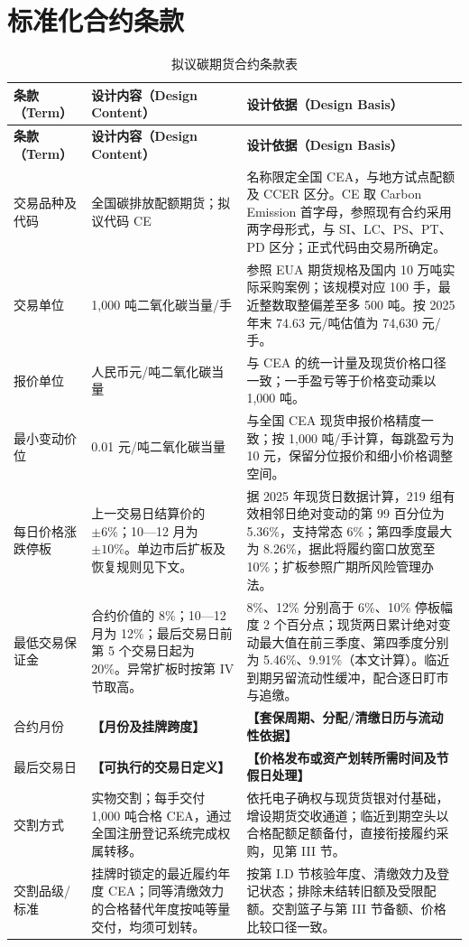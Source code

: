 \documentclass[UTF8,a4paper,11pt,oneside,fontset=fandol]{ctexart}
\newcommand{\fillin}[1]{\textcolor{promptgray}{\textbf{【#1】}}}
\begin{document}
\section{标准化合约条款}
\small
\begin{longtable}{@{}L{0.225\textwidth}L{0.265\textwidth}L{0.445\textwidth}@{}}
\caption{拟议碳期货合约条款表}\label{tab:contract}\\
\toprule
\textbf{条款（Term）} & \textbf{设计内容（Design Content）} & \textbf{设计依据（Design Basis）}\\
\midrule
\endfirsthead
\toprule
\textbf{条款（Term）} & \textbf{设计内容（Design Content）} & \textbf{设计依据（Design Basis）}\\
\midrule
\endhead
\bottomrule
\endfoot
交易品种及代码 & 全国碳排放配额期货；拟议代码 CE & 名称限定全国 CEA，与地方试点配额及 CCER 区分。CE 取 Carbon Emission 首字母，参照现有合约采用两字母形式\cite{gfexProductCodes2026}，与 SI、LC、PS、PT、PD 区分；正式代码由交易所确定。\\
交易单位 & 1,000 吨二氧化碳当量/手 & 参照 EUA 期货规格及国内 10 万吨实际采购案例\cite{iceEuaSpecs,sinopec2021bulk}；该规模对应 100 手，最近整数取整偏差至多 500 吨。按 2025 年末 74.63 元/吨\cite{mee2026}估值为 74,630 元/手。\\
报价单位 & 人民币元/吨二氧化碳当量 & 与 CEA 的统一计量\cite{state2024}及现货价格口径\cite{she2025daily}一致；一手盈亏等于价格变动乘以 1,000 吨。\\
最小变动价位 & 0.01 元/吨二氧化碳当量 & 与全国 CEA 现货申报价格精度一致\cite{mee2021trade}；按 1,000 吨/手计算，每跳盈亏为 10 元，保留分位报价和细小价格调整空间。\\
每日价格涨跌停板 & 上一交易日结算价的 $\pm6\%$；10—12 月为 $\pm10\%$。单边市后扩板及恢复规则见下文。 & 据 2025 年现货日数据\cite{she2025daily}计算，219 组有效相邻日绝对变动的第 99 百分位为 5.36\%，支持常态 6\%；第四季度最大为 8.26\%，据此将履约窗口放宽至 10\%；扩板参照广期所风险管理办法\cite{gfexRisk2022reprint}。\\
最低交易保证金 & 合约价值的 8\%；10—12 月为 12\%；最后交易日前第 5 个交易日起为 20\%。异常扩板时按第 IV 节取高。 & 8\%、12\% 分别高于 6\%、10\% 停板幅度 2 个百分点；现货两日累计绝对变动最大值在前三季度、第四季度分别为 5.46\%、9.91\%\cite{she2025daily}（本文计算）。临近到期另留流动性缓冲，配合逐日盯市与追缴。\\
合约月份 & \fillin{月份及挂牌跨度} & \fillin{套保周期、分配/清缴日历与流动性依据}\\
最后交易日 & \fillin{可执行的交易日定义} & \fillin{价格发布或资产划转所需时间及节假日处理}\\
交割方式 & 实物交割；每手交付 1,000 吨合格 CEA，通过全国注册登记系统完成权属转移。 & 依托电子确权与现货货银对付基础，增设期货交收通道；临近到期空头以合格配额足额备付，直接衔接履约采购，见第 III 节。\\
交割品级/标准 & 挂牌时锁定的最近履约年度 CEA；同等清缴效力的合格替代年度按吨等量交付，均须可划转。 & 按第 I.D 节核验年度、清缴效力及登记状态；排除未结转旧额及受限配额。交割篮子与第 III 节备额、价格比较口径一致。\\
\end{longtable}
\end{document}
